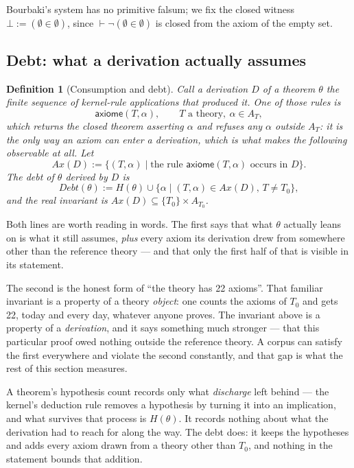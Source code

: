 \documentclass[11pt]{article}
\newtheorem{definition}{Definition}
\theoremstyle{remark}\newtheorem{example}{Example}
\begin{document}
Bourbaki's system has no primitive falsum; we fix the closed witness
$\bot := (\emptyset \in \emptyset)$, since $\vdash \neg(\emptyset \in \emptyset)$ is
closed from the axiom of the empty set.

\subsection{Debt: what a derivation actually assumes}
\begin{definition}[Consumption and debt]
Call a \emph{derivation} $D$ of a theorem $\theta$ the finite sequence of kernel-rule
applications that produced it. One of those rules is
\[ \mathsf{axiome}(T, \alpha) , \qquad T \text{ a theory}, \ \alpha \in A_T , \]
which returns the closed theorem asserting $\alpha$ and refuses any $\alpha$ outside
$A_T$: it is the only way an axiom can enter a derivation, which is what makes the
following observable at all. Let
\[ Ax(D) := \{ (T, \alpha) \mid \text{the rule } \mathsf{axiome}(T,\alpha) \text{ occurs in } D \}. \]
The \emph{debt} of $\theta$ derived by $D$ is
\[ \mathit{Debt}(\theta) := H(\theta) \cup \{ \alpha \mid (T,\alpha) \in Ax(D),\, T \neq T_0 \}, \]
and the \emph{real invariant} is $Ax(D) \subseteq \{T_0\} \times A_{T_0}$.
\end{definition}

Both lines are worth reading in words. The first says that what $\theta$ actually
leans on is what it still assumes, \emph{plus} every axiom its derivation drew from
somewhere other than the reference theory --- and that only the first half of that is
visible in its statement.

The second is the honest form of ``the theory has 22 axioms''. That familiar invariant
is a property of a theory \emph{object}: one counts the axioms of $T_0$ and gets 22,
today and every day, whatever anyone proves. The invariant above is a property of a
\emph{derivation}, and it says something much stronger --- that this particular proof
owed nothing outside the reference theory. A corpus can satisfy the first everywhere
and violate the second constantly, and that gap is what the rest of this section
measures.

A theorem's hypothesis count records only what \emph{discharge} left behind --- the
kernel's deduction rule removes a hypothesis by turning it into an implication, and
what survives that process is $H(\theta)$. It records nothing about what the derivation
had to reach for along the way. The debt does: it keeps the hypotheses and adds every
axiom drawn from a theory other than $T_0$, and nothing in the statement bounds that
addition.
\end{document}
